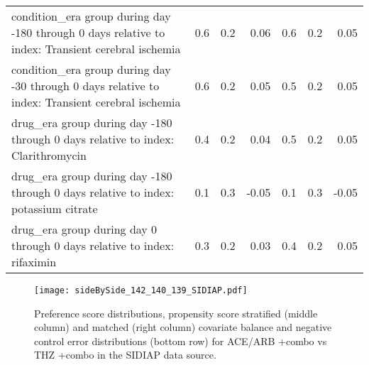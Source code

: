 \documentclass[11pt,]{article}
\begin{document}
\begin{longtable}{p{30em}rrrrrr}
  condition\_era group during day -180 through 0 days relative to index: Transient cerebral ischemia & 0.6 & 0.2 & 0.06 & 0.6 & 0.2 & 0.05 \\ 
  condition\_era group during day -30 through 0 days relative to index: Transient cerebral ischemia & 0.6 & 0.2 & 0.05 & 0.5 & 0.2 & 0.05 \\ 
  drug\_era group during day -180 through 0 days relative to index: Clarithromycin & 0.4 & 0.2 & 0.04 & 0.5 & 0.2 & 0.05 \\ 
  drug\_era group during day -180 through 0 days relative to index: potassium citrate & 0.1 & 0.3 & -0.05 & 0.1 & 0.3 & -0.05 \\ 
  drug\_era group during day 0 through 0 days relative to index: rifaximin & 0.3 & 0.2 & 0.03 & 0.4 & 0.2 & 0.05 \\ 
  \bottomrule
\end{longtable}
\clearpage\begin{figure}[H]
    \caption{Preference score distributions,
    propensity score stratified (middle column) and matched (right column) covariate balance
    and negative control error distributions (bottom row) for
    ACE/ARB +combo vs THZ +combo in the SIDIAP data source.}
    \centerline{
        \texttt{[image: sideBySide\_142\_140\_139\_SIDIAP.pdf]}
    }
\end{figure}
\end{document}
